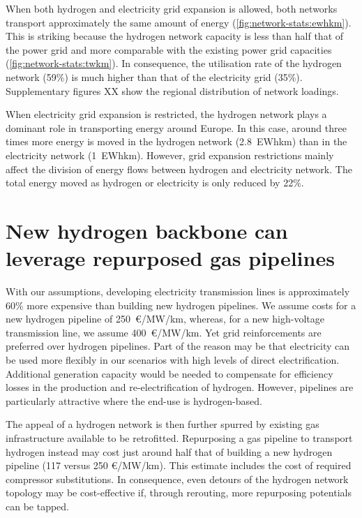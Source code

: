 
When both hydrogen and electricity grid expansion is allowed, both networks
transport approximately the same amount of energy
(\cref{fig:network-stats:ewhkm}). This is striking because the hydrogen network
capacity is less than half that of the power grid and more comparable with the
existing power grid capacities (\cref{fig:network-stats:twkm}). In consequence,
the utilisation rate of the hydrogen network (59\%) is much higher than that of
the electricity grid (35\%). Supplementary figures XX show the regional
distribution of network loadings.


When electricity grid expansion is restricted, the hydrogen network plays a
dominant role in transporting energy around Europe. In this case, around three
times more energy is moved in the hydrogen network (2.8~EWhkm) than in the
electricity network (1~EWhkm). However, grid expansion restrictions mainly
affect the division of energy flows between hydrogen and electricity network.
The total energy moved as hydrogen or electricity is only reduced by 22\%.

\section*{New hydrogen backbone can leverage repurposed gas pipelines}
\label{sec:repurposed}


With our assumptions, developing electricity transmission lines is approximately
60\% more expensive than building new hydrogen pipelines. We assume costs for a
new hydrogen pipeline of 250~\euro/MW/km, whereas, for a new high-voltage
transmission line, we assume 400~\euro/MW/km. Yet grid reinforcements are
preferred over hydrogen pipelines. Part of the reason may be that electricity
can be used more flexibly in our scenarios with high levels of direct
electrification. Additional generation capacity would be needed to compensate
for efficiency losses in the production and re-electrification of hydrogen.
However, pipelines are particularly attractive where the end-use is
hydrogen-based.


The appeal of a hydrogen network is then further spurred by existing gas
infrastructure available to be retrofitted. Repurposing a gas pipeline to
transport hydrogen instead may cost just around half that of building a new
hydrogen pipeline (117 versus 250 \euro/MW/km). This estimate includes the cost
of required compressor substitutions. In consequence, even detours of the
hydrogen network topology may be cost-effective if, through rerouting, more
repurposing potentials can be tapped.

